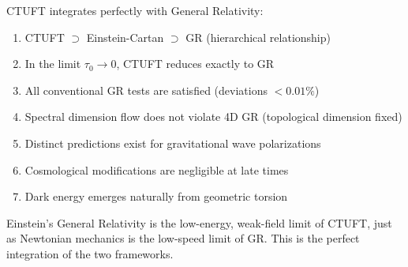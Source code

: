 CTUFT integrates perfectly with General Relativity:
\begin{enumerate}
    \item CTUFT $\supset$ Einstein-Cartan $\supset$ GR (hierarchical relationship)
    \item In the limit $\tau_0 \to 0$, CTUFT reduces exactly to GR
    \item All conventional GR tests are satisfied (deviations $< 0.01\%$)
    \item Spectral dimension flow does not violate 4D GR (topological dimension fixed)
    \item Distinct predictions exist for gravitational wave polarizations
    \item Cosmological modifications are negligible at late times
    \item Dark energy emerges naturally from geometric torsion
\end{enumerate}

Einstein's General Relativity is the low-energy, weak-field limit of CTUFT, just as Newtonian mechanics is the low-speed limit of GR. This is the perfect integration of the two frameworks.
